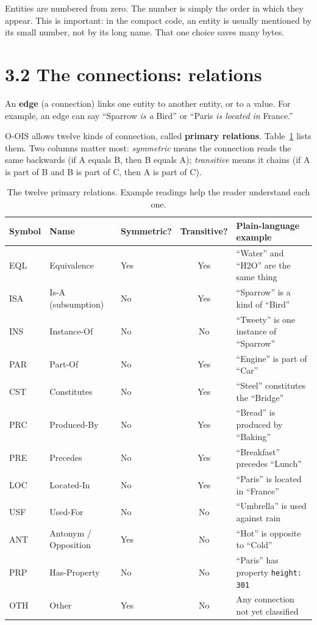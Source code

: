 Entities are numbered from zero. The number is simply the order in which they appear. This is important: in the compact code, an entity is usually mentioned by its small number, not by its long name. That one choice saves many bytes.

\section*{3.2 The connections: relations}

An \textbf{edge} (a connection) links one entity to another entity, or to a value. For example, an edge can say ``Sparrow \textit{is a} Bird'' or ``Paris \textit{is located in} France.''

O-OIS allows twelve kinds of connection, called \textbf{primary relations}. Table~\ref{tab:primary_relations} lists them. Two columns matter most: \textit{symmetric} means the connection reads the same backwards (if A equals B, then B equals A); \textit{transitive} means it chains (if A is part of B and B is part of C, then A is part of C).

\begin{table}[ht]
\caption{The twelve primary relations. Example readings help the reader understand each one.}
\label{tab:primary_relations}
\small
\setlength{\tabcolsep}{5pt}
\begin{tabular}{lllcl}
\toprule
Symbol & Name & Symmetric? & Transitive? & Plain-language example \\
\midrule
EQL & Equivalence & Yes & Yes & ``Water'' and ``H2O'' are the same thing \\
ISA & Is-A (subsumption) & No & Yes & ``Sparrow'' is a kind of ``Bird'' \\
INS & Instance-Of & No & No & ``Tweety'' is one instance of ``Sparrow'' \\
PAR & Part-Of & No & Yes & ``Engine'' is part of ``Car'' \\
CST & Constitutes & No & Yes & ``Steel'' constitutes the ``Bridge'' \\
PRC & Produced-By & No & Yes & ``Bread'' is produced by ``Baking'' \\
PRE & Precedes & No & Yes & ``Breakfast'' precedes ``Lunch'' \\
LOC & Located-In & No & Yes & ``Paris'' is located in ``France'' \\
USF & Used-For & No & No & ``Umbrella'' is used against rain \\
ANT & Antonym / Opposition & Yes & No & ``Hot'' is opposite to ``Cold'' \\
PRP & Has-Property & No & No & ``Paris'' has property \texttt{height: 301} \\
OTH & Other & Yes & No & Any connection not yet classified \\
\bottomrule
\end{tabular}
\end{table}

